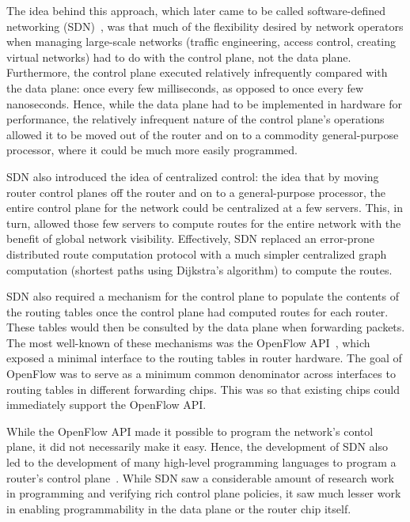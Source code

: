 The idea behind this approach, which later came to be called software-defined
networking (SDN)~\cite{sdn_coining}, was that much of the flexibility desired
by network operators when managing large-scale networks (\eg traffic
engineering, access control, creating virtual networks) had to do with the
control plane, not the data plane.  Furthermore, the control plane executed
relatively infrequently compared with the data plane: once every few
milliseconds, as opposed to once every few nanoseconds. Hence, while the data
plane had to be implemented in hardware for performance, the relatively
infrequent nature of the control plane's operations allowed it to be moved out
of the router and on to a commodity general-purpose processor, where it could
be much more easily programmed.

SDN also introduced the idea of centralized control: the idea that by moving
router control planes off the router and on to a general-purpose processor, the
entire control plane for the network could be centralized at a few servers.
This, in turn, allowed those few servers to compute routes for the entire
network with the benefit of global network visibility. Effectively, SDN
replaced an error-prone distributed route computation protocol with a much
simpler centralized graph computation (\eg shortest paths using Dijkstra's
algorithm) to compute the routes.

SDN also required a mechanism for the control plane to populate the contents of
the routing tables once the control plane had computed routes for each router.
These tables would then be consulted by the data plane when forwarding packets.
The most well-known of these mechanisms was the OpenFlow API~\cite{openflow},
which exposed a minimal interface to the routing tables in router hardware.
The goal of OpenFlow was to serve as a minimum common denominator across
interfaces to routing tables in different forwarding chips. This was so that
existing chips could immediately support the OpenFlow API.

While the OpenFlow API made it possible to program the network's contol plane,
it did not necessarily make it easy. Hence, the development of SDN also led to
the development of many high-level programming languages to program a router's
control plane~\cite{frenetic, pyretic}. While SDN saw a considerable amount of
research work in programming and verifying rich control plane policies, it saw
much lesser work in enabling programmability in the data plane or the router
chip itself.

